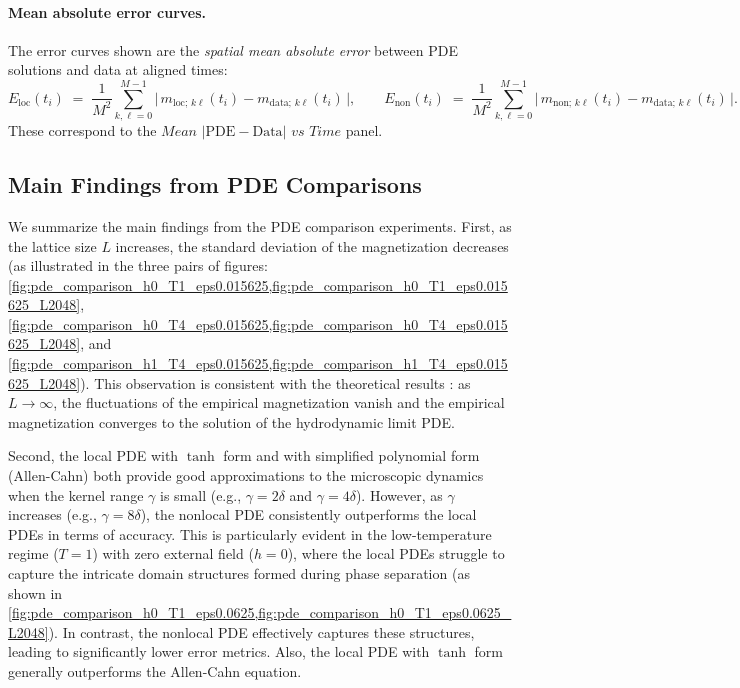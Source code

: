 \documentclass[11pt,a4paper]{article}
\begin{document}
\paragraph{Mean absolute error curves.} The error curves shown are the \emph{spatial mean absolute error} between PDE solutions and data at aligned times:
\begin{equation}
    E_{\text{loc}}(t_i) \;=\; \frac{1}{M^2} \sum_{k,\ell=0}^{M-1} \big|\, m_{\text{loc};\,k\ell}(t_i) - m_{\text{data};\,k\ell}(t_i) \,\big|,
    \qquad
    E_{\text{non}}(t_i) \;=\; \frac{1}{M^2} \sum_{k,\ell=0}^{M-1} \big|\, m_{\text{non};\,k\ell}(t_i) - m_{\text{data};\,k\ell}(t_i) \,\big|.
\end{equation}
These correspond to the $\textit{Mean $|\mathrm{PDE}-\mathrm{Data}|$ vs Time}$ panel.

\subsection{Main Findings from PDE Comparisons}
\label{subsec:main_findings}
We summarize the main findings from the PDE comparison experiments.
First, as the lattice size $L$ increases, the standard deviation of the magnetization decreases 
(as illustrated in the three pairs of figures: 
\cref{fig:pde_comparison_h0_T1_eps0.015625,fig:pde_comparison_h0_T1_eps0.015625_L2048}, 
\cref{fig:pde_comparison_h0_T4_eps0.015625,fig:pde_comparison_h0_T4_eps0.015625_L2048}, 
and \cref{fig:pde_comparison_h1_T4_eps0.015625,fig:pde_comparison_h1_T4_eps0.015625_L2048}). 
This observation is consistent with the theoretical results : as $L \to \infty$, the fluctuations of the empirical magnetization vanish and the empirical magnetization converges to the solution of the hydrodynamic limit PDE.

Second, the local PDE with $\tanh$ form and with simplified polynomial form (Allen-Cahn) both provide good approximations to the microscopic dynamics when the kernel range $\gamma$ is small (e.g., $\gamma=2\delta$ and $\gamma=4\delta$). 
However, as $\gamma$ increases (e.g., $\gamma=8\delta$), the nonlocal PDE consistently outperforms the local PDEs in terms of accuracy. 
This is particularly evident in the low-temperature regime ($T=1$) with zero external field ($h=0$), where the local PDEs struggle to capture the intricate domain structures formed during phase separation (as shown in \cref{fig:pde_comparison_h0_T1_eps0.0625,fig:pde_comparison_h0_T1_eps0.0625_L2048}). 
In contrast, the nonlocal PDE effectively captures these structures, leading to significantly lower error metrics.
Also, the local PDE with $\tanh$ form generally outperforms the Allen-Cahn equation.
\end{document}
